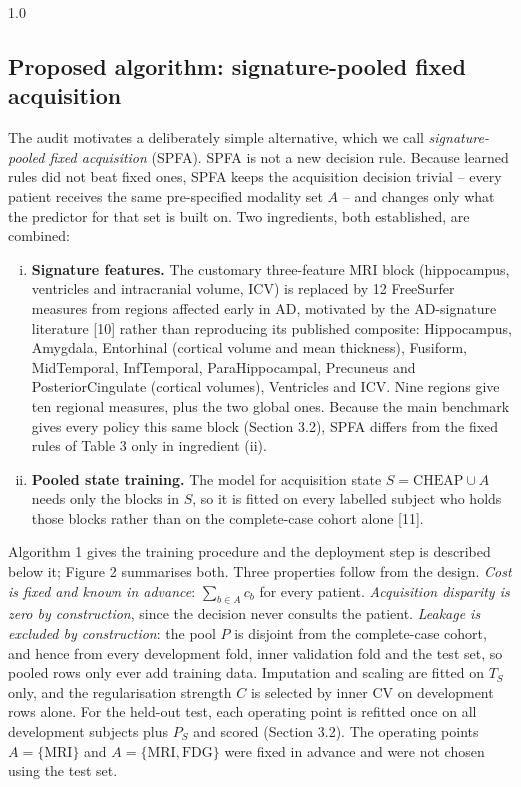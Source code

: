 \documentclass[12pt,twoside]{article}
\begin{document}
\begin{spacing}{1.0}
\subsection{Proposed algorithm: signature-pooled fixed acquisition}
The audit motivates a deliberately simple alternative, which we call
\emph{signature-pooled fixed acquisition} (SPFA). SPFA is not a new decision
rule. Because learned rules did not beat fixed ones, SPFA keeps the
acquisition decision trivial -- every patient receives the same pre-specified
modality set $A$ -- and changes only what the predictor for that set is built
on. Two ingredients, both established, are combined:

\begin{enumerate}[(i)]
\item \textbf{Signature features.} The customary three-feature MRI block
(hippocampus, ventricles and intracranial volume, ICV) is replaced by 12
FreeSurfer measures from regions affected early in AD, motivated by the
AD-signature literature [10] rather than reproducing its published composite:
Hippocampus, Amygdala, Entorhinal (cortical volume and mean thickness),
Fusiform, MidTemporal, InfTemporal, ParaHippocampal, Precuneus and
PosteriorCingulate (cortical volumes), Ventricles and ICV. Nine regions give
ten regional measures, plus the two global ones. Because the main benchmark
gives every policy this same block (Section 3.2), SPFA differs from the fixed
rules of Table 3 only in ingredient (ii).
\item \textbf{Pooled state training.} The model for acquisition state
$S=\mathrm{CHEAP}\cup A$ needs only the blocks in $S$, so it is fitted on
every labelled subject who holds those blocks rather than on the
complete-case cohort alone [11].
\end{enumerate}

Algorithm 1 gives the training procedure and the deployment step is
described below it; Figure 2 summarises both. Three properties follow from the design.
\emph{Cost is fixed and known in advance}: $\sum_{b\in A}c_b$ for every
patient. \emph{Acquisition disparity is zero by construction}, since the
decision never consults the patient. \emph{Leakage is excluded by construction}: the
pool $P$ is disjoint from the complete-case cohort, and hence from every
development fold, inner validation fold and the test set, so pooled rows only
ever add training data. Imputation and scaling are fitted on $T_S$ only, and
the regularisation strength $C$ is selected by inner CV on development rows
alone. For the held-out test, each operating point is refitted once on all
development subjects plus $P_S$ and scored (Section 3.2). The operating points $A=\{\mathrm{MRI}\}$ and $A=\{\mathrm{MRI},\mathrm{FDG}\}$
were fixed in advance and were not chosen using the test set.


\end{spacing}
\end{document}
